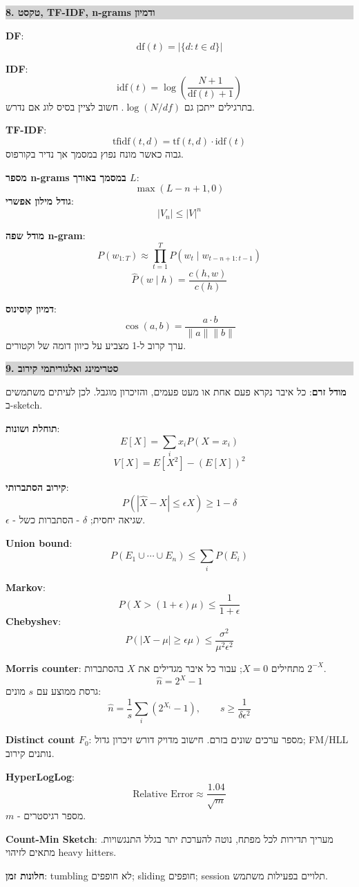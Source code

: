 \documentclass[10pt,a4paper]{article}
\newcommand{\eng}[1]{\textenglish{#1}}
\newcommand{\term}[1]{\textbf{#1}}
\newcommand{\formula}[1]{\[
#1
\]}
\newenvironment{cheatbox}[1]{
  \vspace{2pt}
  \noindent\colorbox{lightgray}{\parbox{\dimexpr\linewidth-2\fboxsep}{\textbf{\color{sectionblue}#1}}}
  \vspace{2pt}
}{\vspace{3pt}}
\begin{document}
\begin{multicols}{2}
\begin{cheatbox}{8. טקסט, \eng{TF-IDF}, \eng{n-grams} ודמיון}
\term{\eng{DF}}:
\formula{\text{df}(t)=|\{d:t\in d\}|}

\term{\eng{IDF}}:
\formula{\text{idf}(t)=\log\left(\frac{N+1}{\text{df}(t)+1}\right)}
בתרגילים ייתכן גם $\log(N/df)$. חשוב לציין בסיס לוג אם נדרש.

\term{\eng{TF-IDF}}:
\formula{\text{tfidf}(t,d)=\text{tf}(t,d)\cdot \text{idf}(t)}
גבוה כאשר מונח נפוץ במסמך אך נדיר בקורפוס.

\term{מספר \eng{n-grams} במסמך באורך $L$}:
\formula{\max(L-n+1,0)}
\term{גודל מילון אפשרי}:
\formula{|V_n|\le |V|^n}

\term{מודל שפה \eng{n-gram}}:
\formula{P(w_{1:T})\approx\prod_{t=1}^{T}P(w_t\mid w_{t-n+1:t-1})}
\formula{\hat P(w\mid h)=\frac{c(h,w)}{c(h)}}

\term{דמיון קוסינוס}:
\formula{\cos(a,b)=\frac{a\cdot b}{\|a\|\|b\|}}
ערך קרוב ל-1 מצביע על כיוון דומה של וקטורים.
\end{cheatbox}

\begin{cheatbox}{9. סטרימינג ואלגוריתמי קירוב}
\term{מודל זרם}: כל איבר נקרא פעם אחת או מעט פעמים, והזיכרון מוגבל. לכן לעיתים משתמשים ב-\eng{sketch}.

\term{תוחלת ושונות}:
\formula{E[X]=\sum_i x_iP(X=x_i)}
\formula{V[X]=E[X^2]-(E[X])^2}

\term{קירוב הסתברותי}:
\formula{P(|\hat X-X|\le \epsilon X)\ge 1-\delta}
$\epsilon$ - שגיאה יחסית; $\delta$ - הסתברות כשל.

\term{\eng{Union bound}}:
\formula{P(E_1\cup\cdots\cup E_n)\le \sum_i P(E_i)}

\term{\eng{Markov}}:
\formula{P(X>(1+\epsilon)\mu)\le \frac{1}{1+\epsilon}}
\term{\eng{Chebyshev}}:
\formula{P(|X-\mu|\ge \epsilon\mu)\le \frac{\sigma^2}{\mu^2\epsilon^2}}

\term{\eng{Morris counter}}: מתחילים $X=0$; עבור כל איבר מגדילים את $X$ בהסתברות $2^{-X}$.
\formula{\hat n=2^X-1}
גרסת ממוצע עם $s$ מונים:
\formula{\hat n=\frac{1}{s}\sum_i(2^{X_i}-1),\qquad s\ge \frac{1}{\delta\epsilon^2}}

\term{\eng{Distinct count} $F_0$}: מספר ערכים שונים בזרם. חישוב מדויק דורש זיכרון גדול; \eng{FM/HLL} נותנים קירוב.

\term{\eng{HyperLogLog}}:
\formula{\text{Relative Error}\approx \frac{1.04}{\sqrt{m}}}
$m$ - מספר רגיסטרים.

\term{\eng{Count-Min Sketch}}: מעריך תדירות לכל מפתח, נוטה להערכת יתר בגלל התנגשויות. מתאים לזיהוי \eng{heavy hitters}.

\term{חלונות זמן}: \eng{tumbling} לא חופפים; \eng{sliding} חופפים; \eng{session} תלויים בפעילות משתמש.


\end{cheatbox}
\end{multicols}
\end{document}
